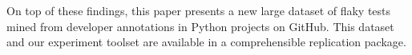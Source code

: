 On top of these findings, this paper presents a new large dataset of flaky tests mined from developer annotations in Python projects on GitHub.
This dataset and our experiment toolset are available in a comprehensible replication package.


